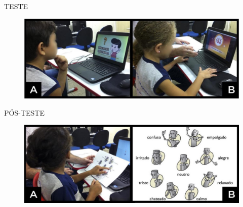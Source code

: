 \documentclass{Alexandre}
\begin{document}
\begin{frame}{TESTE}
    
    \begin{figure}
        \includegraphics[scale = 0.25]{Figuras/JogoxAnimacao.jpg}
    \end{figure}

\end{frame}


\begin{frame}{PÓS-TESTE}
    
    \begin{figure}
        \includegraphics[scale = 0.25]{Figuras/pos-teste.jpg}
    \end{figure}

\end{frame}
\end{document}
